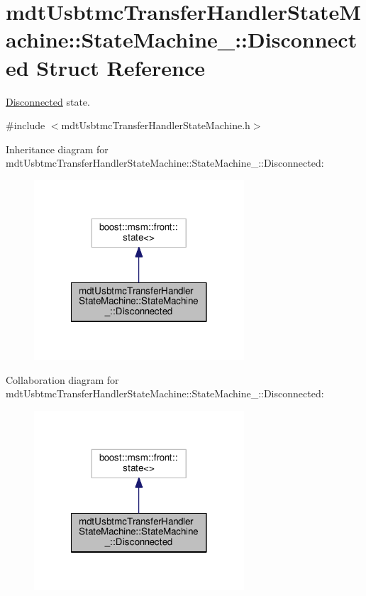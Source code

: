 \hypertarget{structmdt_usbtmc_transfer_handler_state_machine_1_1_state_machine___1_1_disconnected}{\section{mdt\-Usbtmc\-Transfer\-Handler\-State\-Machine\-:\-:State\-Machine\-\_\-\-:\-:Disconnected Struct Reference}
\label{structmdt_usbtmc_transfer_handler_state_machine_1_1_state_machine___1_1_disconnected}
}


\hyperlink{structmdt_usbtmc_transfer_handler_state_machine_1_1_state_machine___1_1_disconnected}{Disconnected} state.  




{\ttfamily \#include $<$mdt\-Usbtmc\-Transfer\-Handler\-State\-Machine.\-h$>$}



Inheritance diagram for mdt\-Usbtmc\-Transfer\-Handler\-State\-Machine\-:\-:State\-Machine\-\_\-\-:\-:Disconnected\-:\nopagebreak
\begin{figure}[H]
\begin{center}
\leavevmode
\includegraphics[width=222pt]{structmdt_usbtmc_transfer_handler_state_machine_1_1_state_machine___1_1_disconnected__inherit__graph}
\end{center}
\end{figure}


Collaboration diagram for mdt\-Usbtmc\-Transfer\-Handler\-State\-Machine\-:\-:State\-Machine\-\_\-\-:\-:Disconnected\-:\nopagebreak
\begin{figure}[H]
\begin{center}
\leavevmode
\includegraphics[width=222pt]{structmdt_usbtmc_transfer_handler_state_machine_1_1_state_machine___1_1_disconnected__coll__graph}
\end{center}
\end{figure}
